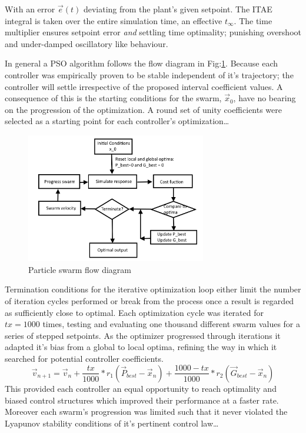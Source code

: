 With an error $\vec{e}(t)$ deviating from the plant's given setpoint. The ITAE integral is taken over the entire simulation time, an effective $t_\infty$. The time multiplier ensures setpoint error \emph{and} settling time optimality; punishing overshoot and under-damped oscillatory like behaviour.
\par
In general a PSO algorithm follows the flow diagram in Fig:\ref{fig:particle-diagram}. Because each controller was empirically proven to be stable independent of it's trajectory; the controller will settle irrespective of the proposed interval coefficient values. A consequence of this is the starting conditions for the swarm, $\vec{x}_0$, have no bearing on the progression of the optimization. A round set of unity coefficients were selected as a starting point for each controller's optimization\ldots
\begin{figure}[htbp]
\centering
\includegraphics[width=0.7\textwidth]{figs/particle-diagram}
\caption{Particle swarm flow diagram}
\label{fig:particle-diagram}
\end{figure}
\par
Termination conditions for the iterative optimization loop either limit the number of iteration cycles performed or break from the process once a result is regarded as sufficiently close to optimal. Each optimization cycle was iterated for $tx=1000$ times, testing and evaluating one thousand different swarm values for a series of stepped setpoints. As the optimizer progressed through iterations it adapted it's bias from a global to local optima, refining the way in which it searched for potential controller coefficients.
\begin{equation}
\vec{v}_{n+1}=\vec{v}_n+\frac{tx}{1000}\ast r_1(\vec{P}_{best}-\vec{x}_n)+\frac{1000-tx}{1000}\ast r_2(\vec{G}_{best}-\vec{x}_n)
\end{equation}
This provided each controller an equal opportunity to reach optimality and biased control structures which improved their performance at a faster rate. Moreover each swarm's progression was limited such that it never violated the Lyapunov stability conditions of it's pertinent control law\ldots
